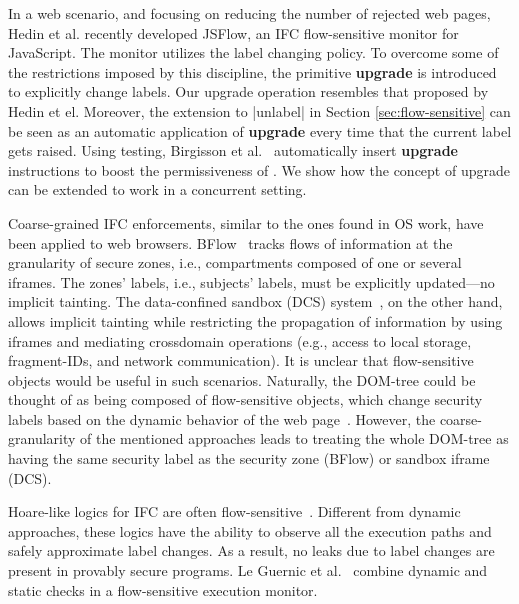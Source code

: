 In a web scenario, and focusing on reducing the number of rejected web pages,
Hedin et al. \citep{Hedin13} recently developed JSFlow, an IFC flow-sensitive
monitor for JavaScript. The monitor utilizes the {\nsu} label changing
policy. To overcome some of the restrictions imposed by this discipline, the
primitive \textbf{upgrade} is introduced to explicitly change labels. Our
upgrade operation resembles that proposed by Hedin et el. Moreover, the
extension to |unlabel| in Section \ref{sec:flow-sensitive} can be seen as an
automatic application of \textbf{upgrade} every time that the current label gets
raised. Using testing, Birgisson et al.~\citep{Arnar2012} automatically insert
\textbf{upgrade} instructions to boost the permissiveness of {\nsu}. We show how
the concept of upgrade can be extended to work in a concurrent setting.



Coarse-grained IFC enforcements, similar to the ones found in OS work, have been
applied to web browsers. BFlow~\citep{Yip:2009} tracks flows of information at
the granularity of secure zones, i.e., compartments composed of one or several
iframes. The zones' labels, i.e., subjects' labels, must be explicitly updated---no
implicit tainting. The data-confined sandbox (DCS)
system~\citep{conf/esorics/AkhaweLHSS13}, on the other hand, allows implicit
tainting while restricting the propagation of information by using iframes and
mediating crossdomain operations (e.g., access to local storage, fragment-IDs, and
network communication). It is unclear that flow-sensitive objects would be
useful in such scenarios. Naturally, the DOM-tree could be thought of as being
composed of flow-sensitive objects, which change security labels based on the
dynamic behavior of the web page~\citep{Russo:2009}. However, the
coarse-granularity of the mentioned approaches leads to treating the whole DOM-tree
as having the same security label as the security zone (BFlow) or sandbox iframe
(DCS). 

Hoare-like logics for IFC are often
flow-sensitive~\citep[e.g.][]{Amtoft:2006,Nanevski:2011}. Different from dynamic
approaches, these logics have the ability to observe all the execution paths and
safely approximate label changes. As a result, no leaks due to label changes are
present in provably secure programs.
Le Guernic et al.~\citep{LeGuernic:2006,Guernic:2007:ACM} combine dynamic and
static checks in a flow-sensitive execution monitor.
 



